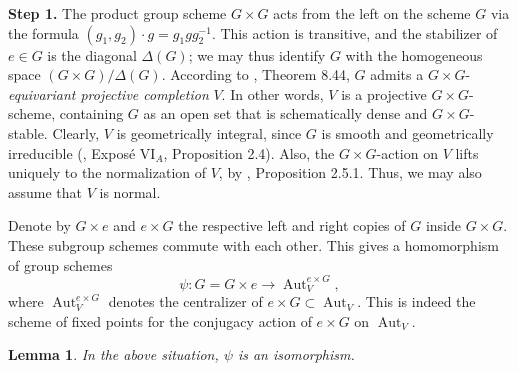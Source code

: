 \documentclass[oneside, 12pt]{amsart}
\newtheorem{lemma}[theorem]{Lemma}
\theoremstyle{definition}
\theoremstyle{remark}
\newcommand{\Aut}{\operatorname{Aut}}
\begin{document}
\bigskip\noindent 
{\bf Step 1.}
The product group scheme $G\times G$ acts from the left 
on the scheme $G$ via the formula $(g_1,g_2)\cdot g=g_1gg_2^{-1}$.
This action is transitive, and the stabilizer of $e\in G$ 
is the diagonal $\Delta(G)$; we may thus identify $G$ with
the homogeneous space $(G \times G)/\Delta(G)$. 
According to \cite{Milne 2017}, Theorem 8.44, $G$ admits a 
$G \times G$-\emph{equivariant projective completion} $V$.
In other words, $V$ is a projective $G\times G$-scheme, 
containing $G$ as an open set that is schematically dense and  
$G\times G$-stable. 
Clearly, $V$ is geometrically integral,
since $G$ is smooth and geometrically irreducible 
(\cite{SGA 3a}, Expos\'e $\text{VI}_{A}$, Proposition 2.4).
Also, the $G \times G$-action on $V$ lifts uniquely to the normalization 
of $V$,  by \cite{Brion 2017}, Proposition 2.5.1. 
Thus, we may also assume that $V$ is normal.

Denote by $G \times e$ and $e\times G$ 
the respective left and right copies of $G$ inside $G\times G$. 
These subgroup schemes commute with each other. This gives 
a homomorphism of group schemes
$$
\psi: G = G \times e \longrightarrow 
\Aut_V^{e \times G},
$$
where $\Aut_V^{e \times G}$ denotes the
centralizer of $e \times G\subset \Aut_V$. This is indeed the 
scheme of fixed points for the
conjugacy action of $e \times G$ on $\Aut_V$.

\begin{lemma}\label{lem:psi}
In the above situation,  $\psi$ is an isomorphism.
\end{lemma}
\end{document}
